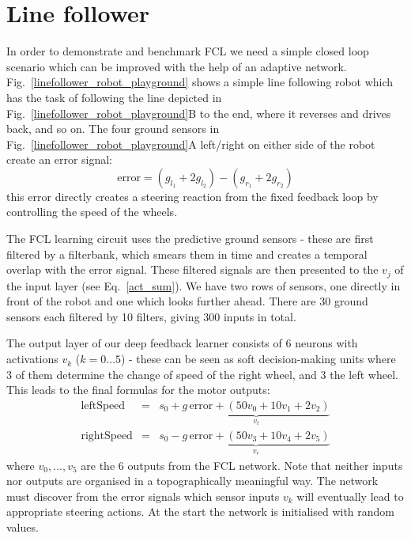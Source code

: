 \documentclass[Afour,sageh,times]{sagej}
\begin{document}
\section{Line follower}
In order to demonstrate and benchmark FCL we need a simple closed loop scenario
which can be improved with the help of an adaptive network.
Fig.~\ref{linefollower_robot_playground} shows a simple line following
robot which has the task of following the line depicted in
Fig.~\ref{linefollower_robot_playground}B to the end, where it
reverses and drives back, and so on. The four ground sensors in
Fig.~\ref{linefollower_robot_playground}A left/right on either side
of the robot create an error signal:
\begin{equation}
\mathrm{error} = (g_{l_1}+2 g_{l_2})-(g_{r_1}+2 g_{r_2}) \label{line_error}
\end{equation}
this error directly creates a steering reaction from the fixed
feedback loop by controlling the speed of the wheels.

The FCL learning circuit uses the predictive ground sensors - these
are first filtered by a filterbank, which smears them in time and
creates a temporal overlap with the error signal. These filtered
signals are then presented to the $v_j$ of the input layer (see
Eq.~\ref{act_sum}). We have two rows of sensors, one directly in front
of the robot and one which looks further ahead. There are 30 ground
sensors each filtered by 10 filters, giving 300 inputs in total.

The output layer of our deep feedback learner consists of 6 neurons
with activations $v_k$ ($k=0 \ldots 5$) - these can be seen as soft
decision-making units where 3 of them determine the change of speed of
the right wheel, and 3 the left wheel. This leads to the
final formulas for the motor outputs:
\begin{eqnarray}
  \mathrm{leftSpeed} &=& s_0 + \underbrace{g\, \mathrm{error} + \left( 50 v_0 + 10 v_1 + 2 v_2 \right)}_{v_l} \\
  \mathrm{rightSpeed} &=& s_0 - \underbrace{g\, \mathrm{error} + \left( 50 v_3 + 10 v_4 + 2 v_5 \right)}_{v_r}
\end{eqnarray}
where $v_0, \ldots, v_5$ are the 6 outputs from the FCL network. Note
that neither inputs nor outputs are organised in a topographically
meaningful way. The network must discover from the error signals
which sensor inputs $v_k$ will eventually lead to appropriate steering
actions. At the start the network is initialised with random values.
\end{document}
